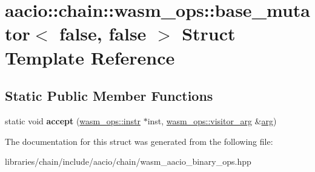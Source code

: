 \hypertarget{structaacio_1_1chain_1_1wasm__ops_1_1base__mutator_3_01false_00_01false_01_4}{}\section{aacio\+:\+:chain\+:\+:wasm\+\_\+ops\+:\+:base\+\_\+mutator$<$ false, false $>$ Struct Template Reference}
\label{structaacio_1_1chain_1_1wasm__ops_1_1base__mutator_3_01false_00_01false_01_4}
\subsection*{Static Public Member Functions}
\begin{DoxyCompactItemize}
\item 
\mbox{\label{structaacio_1_1chain_1_1wasm__ops_1_1base__mutator_3_01false_00_01false_01_4_a5d946d72008939b3716aa9d797496190}} 
static void {\bfseries accept} (\mbox{\hyperlink{structaacio_1_1chain_1_1wasm__ops_1_1instr}{wasm\+\_\+ops\+::instr}} $\ast$inst, \mbox{\hyperlink{structaacio_1_1chain_1_1wasm__ops_1_1visitor__arg}{wasm\+\_\+ops\+::visitor\+\_\+arg}} \&\mbox{\hyperlink{unionarg}{arg}})
\end{DoxyCompactItemize}


The documentation for this struct was generated from the following file\+:\begin{DoxyCompactItemize}
\item 
libraries/chain/include/aacio/chain/wasm\+\_\+aacio\+\_\+binary\+\_\+ops.\+hpp\end{DoxyCompactItemize}
